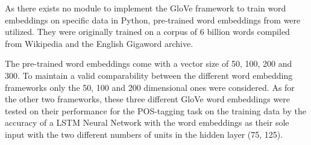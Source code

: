 As there exists no module to implement the GloVe framework to train word embeddings on specific data in Python, pre-trained word embeddings from \citet{pennington2014glove} were utilized. They were originally trained on a corpus of 6 billion words compiled from Wikipedia and the English Gigaword archive.

The pre-trained word embeddings come with a vector size of 50, 100, 200 and 300. To maintain a valid comparability between the different word embedding frameworks only the 50, 100 and 200 dimensional ones were considered. As for the other two frameworks, these three different GloVe word embeddings were tested on their performance for the POS-tagging task on the training data by the accuracy of a LSTM Neural Network with the word embeddings as their sole input with the two different numbers of units in the hidden layer (75, 125).
